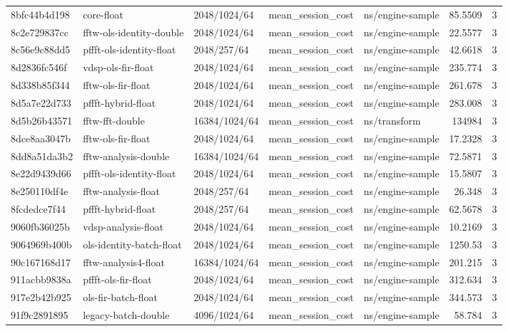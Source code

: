\begin{longtable}{lllllrr}
8bfc44b4d198 & core-float & 2048/1024/64 & mean\_session\_cost & ns/engine-sample & 85.5509 & 3 \\
8c2e729837cc & fftw-ols-identity-double & 2048/1024/64 & mean\_session\_cost & ns/engine-sample & 22.5577 & 3 \\
8c56e9c88dd5 & pffft-ols-identity-float & 2048/257/64 & mean\_session\_cost & ns/engine-sample & 42.6618 & 3 \\
8d2836fc546f & vdsp-ols-fir-float & 2048/1024/64 & mean\_session\_cost & ns/engine-sample & 235.774 & 3 \\
8d338b85f344 & fftw-ols-fir-float & 2048/1024/64 & mean\_session\_cost & ns/engine-sample & 261.678 & 3 \\
8d5a7e22d733 & pffft-hybrid-float & 2048/1024/64 & mean\_session\_cost & ns/engine-sample & 283.008 & 3 \\
8d5b26b43571 & fftw-fft-double & 16384/1024/64 & mean\_session\_cost & ns/transform & 134984 & 3 \\
8dce8aa3047b & fftw-ols-fir-float & 2048/1024/64 & mean\_session\_cost & ns/engine-sample & 17.2328 & 3 \\
8dd8a51da3b2 & fftw-analysis-double & 16384/1024/64 & mean\_session\_cost & ns/engine-sample & 72.5871 & 3 \\
8e22d9439d66 & pffft-ols-identity-float & 2048/1024/64 & mean\_session\_cost & ns/engine-sample & 15.5807 & 3 \\
8e250110df4e & fftw-analysis-float & 2048/257/64 & mean\_session\_cost & ns/engine-sample & 26.348 & 3 \\
8fcdedce7f44 & pffft-hybrid-float & 2048/257/64 & mean\_session\_cost & ns/engine-sample & 62.5678 & 3 \\
9060fb36025b & vdsp-analysis-float & 2048/1024/64 & mean\_session\_cost & ns/engine-sample & 10.2169 & 3 \\
9064969b400b & ols-identity-batch-float & 2048/1024/64 & mean\_session\_cost & ns/engine-sample & 1250.53 & 3 \\
90c167168d17 & fftw-analysis4-float & 16384/1024/64 & mean\_session\_cost & ns/engine-sample & 201.215 & 3 \\
911acbb9838a & pffft-ols-fir-float & 2048/1024/64 & mean\_session\_cost & ns/engine-sample & 312.634 & 3 \\
917e2b42b925 & ols-fir-batch-float & 2048/1024/64 & mean\_session\_cost & ns/engine-sample & 344.573 & 3 \\
91f9c2891895 & legacy-batch-double & 4096/1024/64 & mean\_session\_cost & ns/engine-sample & 58.784 & 3 \\

\end{longtable}
